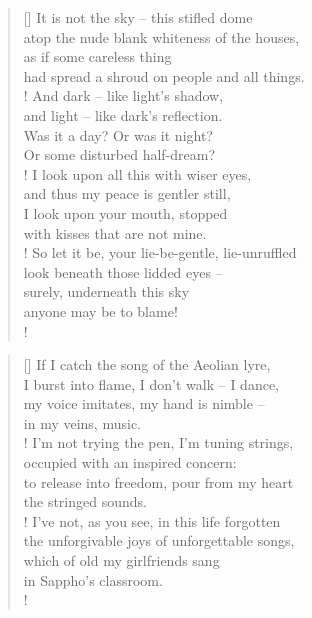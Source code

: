 \documentclass[]{article}
\begin{document}
\vspace*{0.005\textheight}
\settowidth{\versewidth}{Atop the nude blank whiteness}
\begin{verse}[\versewidth]
 It is not the sky -- this stifled dome\\
 atop the nude blank whiteness of the houses,\\
 as if some careless thing\\
 had spread a shroud on people and all things.\\!
And dark -- like light's shadow,\\
and light -- like dark's reflection.\\
Was it a day? Or was it night?\\
Or some disturbed half-dream?\\!
I look upon all this with wiser eyes,\\
and thus my peace is gentler still,\\
I look upon your mouth, stopped\\
with kisses that are not mine.\\!
So let it be, your lie-be-gentle, lie-unruffled\\
look beneath those lidded eyes --\\
surely, underneath this sky\\
anyone may be to blame!\\!
\end{verse}
\bigskip \bigskip

\settowidth{\versewidth}{millenia later, in just such a youthful  }
\begin{verse}[\versewidth]
If I catch the song of the Aeolian lyre,\\
I burst into flame, I don't walk -- I dance,\\
my voice imitates, my hand is nimble --\\
in my veins, music.\\!
I'm not trying the pen, I'm tuning strings,\\
occupied with an inspired concern:\\
to release into freedom, pour from my heart\\
the stringed sounds.\\!
I've not, as you see, in this life forgotten\\
the unforgivable joys of unforgettable songs,\\
which of old my girlfriends sang\\
in Sappho's classroom.\\!
\end{verse}
\newpage 
\end{document}
